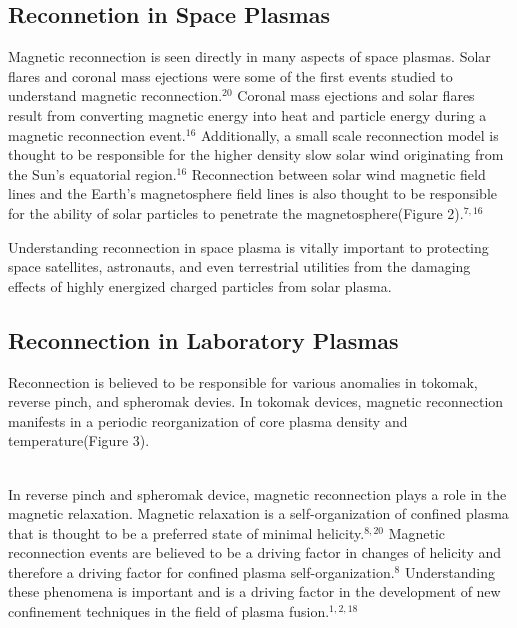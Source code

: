 \documentclass{article}
\begin{document}
\subsection{Reconnetion in Space Plasmas}
Magnetic reconnection is seen directly in many aspects of space plasmas.  Solar flares and coronal mass ejections were some of the first events studied to understand magnetic reconnection.$^{20}$  Coronal mass ejections and solar flares result from converting magnetic energy into heat and particle energy during a magnetic reconnection event.$^{16}$  Additionally, a small scale reconnection model is thought to be responsible for the higher density slow solar wind originating from the Sun's equatorial region.$^{16}$  Reconnection between solar wind magnetic field lines and the Earth's magnetosphere field lines is also thought to be responsible for the ability of solar particles to penetrate the magnetosphere(Figure 2).$^{7,16}$
\begin{SCfigure}
\centering
{}
\end{SCfigure}
Understanding reconnection in space plasma is vitally important to protecting space satellites, astronauts, and even terrestrial utilities from the damaging effects of highly energized charged particles from solar plasma.
\subsection{Reconnection in Laboratory Plasmas}
Reconnection is believed to be responsible for various anomalies in tokomak, reverse pinch, and spheromak devies.  In tokomak devices, magnetic reconnection manifests in a periodic reorganization of core plasma density and temperature(Figure 3).  
\begin{SCfigure}
\centering
{}
\end{SCfigure}
\\In reverse pinch and spheromak device, magnetic reconnection plays a role in the magnetic relaxation.  Magnetic relaxation is a self-organization of confined plasma that is thought to be a preferred state of minimal helicity.$^{8,20}$  Magnetic reconnection events are believed to be a driving factor in changes of helicity and therefore a driving factor for confined plasma self-organization.$^{8}$  Understanding these phenomena is important and is a driving factor in the development of new confinement techniques in the field of plasma fusion.$^{1,2,18}$
\end{document}

